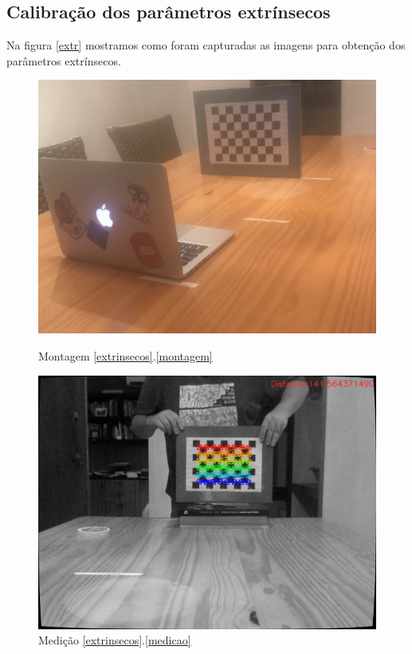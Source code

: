 \documentclass[conference]{IEEEtran}
\begin{document}
\subsection{Calibração dos parâmetros extrínsecos}\label{calibextr}
Na figura \ref{extr} mostramos como foram capturadas as imagens para obtenção dos parâmetros extrínsecos.
\begin{figure}\label{extr}
\centering
\begin{minipage}{.45\columnwidth}
  \centering
  \includegraphics[width=.95\linewidth]{cena.jpg}
  \caption{Montagem \ref{extrinsecos}.\ref{montagem}}
  \label{fig:test1}
\end{minipage}%
\begin{minipage}{.45\columnwidth}
  \centering
  \includegraphics[width=.95\linewidth]{extr.jpg}
  \caption{Medição \ref{extrinsecos}.\ref{medicao}}
  \label{fig:test2}
\end{minipage}
\end{figure}
\end{document}
